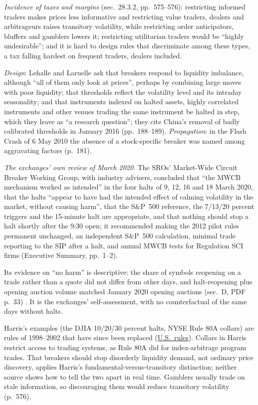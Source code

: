 \begin{qfmechanism}
\emph{Incidence of taxes and margins} (sec.~28.3.2, pp.~575--576): restricting informed traders makes prices less informative and restricting value traders, dealers and arbitrageurs raises transitory volatility, while restricting order anticipators, bluffers and gamblers lowers it; restricting utilitarian traders would be ``highly undesirable''; and it is hard to design rules that discriminate among these types, a tax falling hardest on frequent traders, dealers included.

\emph{Design}: Lehalle and Laruelle ask that breakers respond to liquidity imbalance, although ``all of them only look at prices'', perhaps by combining large moves with poor liquidity; that thresholds reflect the volatility level and its intraday seasonality; and that instruments indexed on halted assets, highly correlated instruments and other venues trading the same instrument be halted in step, which they leave as ``a research question''; they cite China's removal of badly calibrated thresholds in January 2016 (pp.~188--189). \emph{Propagation}: in the Flash Crash of 6 May 2010 the absence of a stock-specific breaker was named among aggravating factors (p.~181).

\emph{The exchanges' own review of March 2020}. The SROs' Market-Wide Circuit Breaker Working Group, with industry advisers, concluded that ``the MWCB mechanism worked as intended'' in the four halts of 9, 12, 16 and 18 March 2020, that the halts ``appear to have had the intended effect of calming volatility in the market, without causing harm'', that the S\&P~500 reference, the 7/13/20 percent triggers and the 15-minute halt are appropriate, and that nothing should stop a halt shortly after the 9:30 open; it recommended making the 2012 pilot rules permanent unchanged, an independent S\&P~500 calculation, minimal trade reporting to the SIP after a halt, and annual MWCB tests for Regulation SCI firms (Executive Summary, pp.~1--2).

Its evidence on ``no harm'' is descriptive: the share of symbols reopening on a trade rather than a quote did not differ from other days, and halt-reopening plus opening auction volume matched January 2020 opening auctions (sec.~D, PDF p.~33) \citep[Report of 31 March 2021, Executive Summary and sec.~D, pp.~1--2 and PDF p.~33]{mwcb-wg-2021}. It is the exchanges' self-assessment, with no counterfactual of the same days without halts.

 Harris's examples (the DJIA 10/20/30 percent halts, NYSE Rule 80A collars) are rules of 1998--2002 that have since been replaced (\hyperref[rule:us-equity-market-structure]{U.S.\ rules}). Collars in Harris restrict access to trading systems, as Rule 80A did for index-arbitrage program trades. That breakers should stop disorderly liquidity demand, not ordinary price discovery, applies Harris's fundamental-versus-transitory distinction; neither source shows how to tell the two apart in real time. Gamblers usually trade on stale information, so discouraging them would reduce transitory volatility (p.~576).


\end{qfmechanism}
